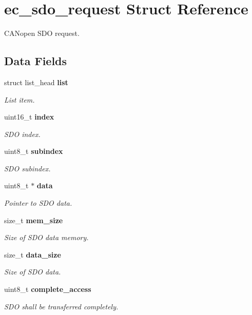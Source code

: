 \section{ec\-\_\-sdo\-\_\-request Struct Reference}
\label{structec__sdo__request}


C\-A\-Nopen S\-D\-O request.  


\subsection*{Data Fields}
\begin{DoxyCompactItemize}
\item 
struct list\-\_\-head {\bf list}
\begin{DoxyCompactList}\small\item\em List item. \end{DoxyCompactList}\item 
uint16\-\_\-t {\bf index}
\begin{DoxyCompactList}\small\item\em S\-D\-O index. \end{DoxyCompactList}\item 
uint8\-\_\-t {\bf subindex}
\begin{DoxyCompactList}\small\item\em S\-D\-O subindex. \end{DoxyCompactList}\item 
uint8\-\_\-t $\ast$ {\bf data}
\begin{DoxyCompactList}\small\item\em Pointer to S\-D\-O data. \end{DoxyCompactList}\item 
size\-\_\-t {\bf mem\-\_\-size}
\begin{DoxyCompactList}\small\item\em Size of S\-D\-O data memory. \end{DoxyCompactList}\item 
size\-\_\-t {\bf data\-\_\-size}
\begin{DoxyCompactList}\small\item\em Size of S\-D\-O data. \end{DoxyCompactList}\item 
uint8\-\_\-t {\bf complete\-\_\-access}
\begin{DoxyCompactList}\small\item\em S\-D\-O shall be transferred completely. \end{DoxyCompactList}\item 

\end{DoxyCompactItemize}
